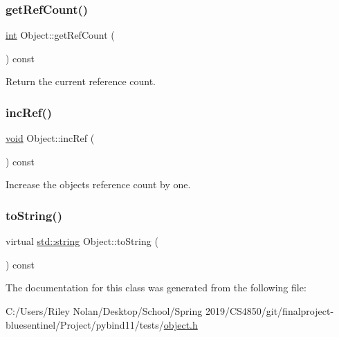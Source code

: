 \subsubsection{\texorpdfstring{getRefCount()}{getRefCount()}}
{\footnotesize\ttfamily \mbox{\hyperlink{warnings_8h_a74f207b5aa4ba51c3a2ad59b219a423b}{int}} Object\+::get\+Ref\+Count (\begin{DoxyParamCaption}{ }\end{DoxyParamCaption}) const\hspace{0.3cm}{\ttfamily [inline]}}



Return the current reference count. 

\mbox{\label{class_object_a769b55a36d5a2d42af6ef37be0789f43}} 
\subsubsection{\texorpdfstring{incRef()}{incRef()}}
{\footnotesize\ttfamily \mbox{\hyperlink{_s_d_l__opengles2__gl2ext_8h_ae5d8fa23ad07c48bb609509eae494c95}{void}} Object\+::inc\+Ref (\begin{DoxyParamCaption}{ }\end{DoxyParamCaption}) const\hspace{0.3cm}{\ttfamily [inline]}}



Increase the object\textquotesingle{}s reference count by one. 

\mbox{\label{class_object_a89fee2453b0e7b4737afac15cf8ed039}} 
\subsubsection{\texorpdfstring{toString()}{toString()}}
{\footnotesize\ttfamily virtual \mbox{\hyperlink{_s_d_l__opengl__glext_8h_ab4ccfaa8ab0e1afaae94dc96ef52dde1}{std\+::string}} Object\+::to\+String (\begin{DoxyParamCaption}{ }\end{DoxyParamCaption}) const\hspace{0.3cm}{\ttfamily [pure virtual]}}



The documentation for this class was generated from the following file\+:\begin{DoxyCompactItemize}
\item 
C\+:/\+Users/\+Riley Nolan/\+Desktop/\+School/\+Spring 2019/\+C\+S4850/git/finalproject-\/bluesentinel/\+Project/pybind11/tests/\mbox{\hyperlink{pybind11_2tests_2object_8h}{object.\+h}}\end{DoxyCompactItemize}

